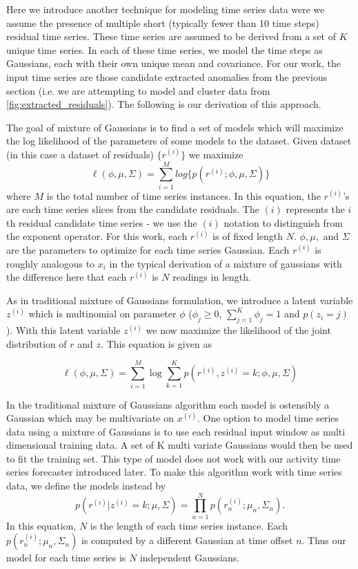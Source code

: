 Here we introduce another technique for modeling time series data were we assume the presence of multiple short (typically fewer than 10 time steps) residual time series.  These time series are assumed to be derived from a set of $K$ unique time series.  In each of these time series, we model the time steps as Gaussians, each with their own unique mean and covariance.   For our work, the input time series are those candidate extracted anomalies from the previous section (i.e. we are attempting to model and cluster data from \ref{fig:extracted_residuals}).  The following is our derivation of this approach.

The goal of mixture of Gaussians is to find a set of models which will maximize the log likelihood of the parameters of some models to the dataset.  Given dataset (in this case a dataset of residuals) $\{r^{(i)}\}$ we maximize
\begin{equation}
\ell(\phi, \mu, \Sigma) = \sum_{i = 1}^{M}log\{p(r^{(i)};\phi, \mu, \Sigma)\}
\end{equation}
\noindent 
where ${M}$ is the total number of time series instances.  In this equation, the $r^{(i)}$'s are each time series slices from the candidate residuals.  The $(i)$ represents the $i$th residual candidate time series - we use the $(i)$ notation to distinguish from the exponent operator.  For this work, each $r^{(i)}$ is of fixed length $N$.  $\phi, \mu,$ and $\Sigma$ are the parameters to optimize for each time series Gaussian.  Each $r^{(i)}$ is roughly analogous to $x_{i}$ in the typical derivation of a mixture of gaussians with the difference here that each $r^{(i)}$ is $N$ readings in length.

As in traditional mixture of Gaussians formulation, we introduce a latent variable $z^{(i)}$ which is multinomial on parameter $\phi$ ($\phi_{j} \ge 0$,  $\sum_{j=1}^{K}{ \phi_{j}} = 1$ and $p(z_{i} = j)$).  With this latent variable $z^{(i)}$ we now maximize the likelihood of the joint distribution of $r$ and $z$.  This equation is given as 

\begin{equation}
\ell(\phi, \mu, \Sigma) = \sum_{i = 1}^{M}\log \sum_{k = 1}^{K}p(r^{(i)}, z^{(i)} = k;\phi, \mu, \Sigma)
\end{equation}

In the traditional mixture of Gaussians algorithm each model is ostensibly a Gaussian which may be multivariate on $x^{(i)}$.  One option to model time series data using a mixture of Gaussians is to use each residual input window as multi dimensional training data.  A set of K multi variate Gaussians would then be used to fit the training set.  This type of model does not work with our activity time series forecaster introduced later.  To make this algorithm work with time series data, we define the models instead by
\begin{equation}
\label{eq:model}
p(r^{(i)}|z^{(i)} = k;\mu, \Sigma) = \prod_{n = 1}^{N}p(r^{(i)}_{n};\mu_{n}, \Sigma_{n}).
\end{equation}
\noindent
In this equation, $N$ is the length of each time series instance.  Each $p(r^{(i)}_{n};\mu_{n}, \Sigma_{n})$ is computed by a different Gaussian at time offset $n$.  Thus our model for each time series is $N$ independent Gaussians.

